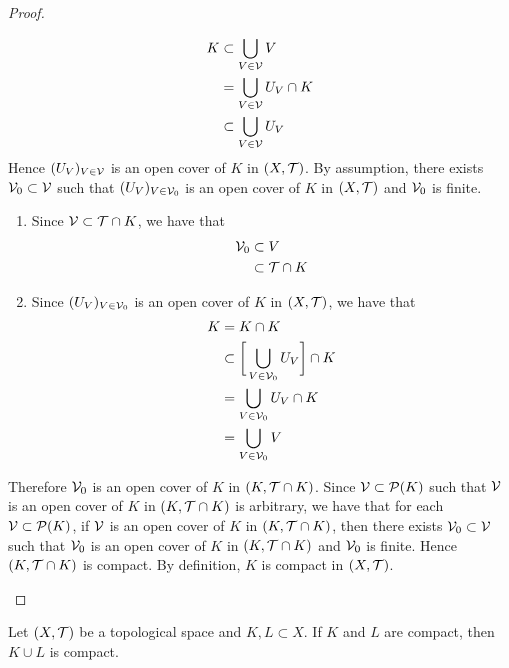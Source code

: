\documentclass{book}
\begin{document}
\begin{proof}
\begin{itemize}
			\begin{align*}
				K 
				& \subset \bigcup_{V \in \mathcal{V}} V \\
				& = \bigcup_{V \in \mathcal{V}} U_V \cap K \\
				& \subset \bigcup_{V \in \mathcal{V}} U_V \\
			\end{align*}
			Hence $(U_V)_{V \in \mathcal{V}}$ is an open cover of $K$ in $(X, \mathcal{T})$. By assumption, there exists $\mathcal{V}_0 \subset \mathcal{V}$ such that $(U_V)_{V \in \mathcal{V}_0}$ is an open cover of $K$ in $(X, \mathcal{T})$ and $\mathcal{V}_0$ is finite. 
			\begin{enumerate}
				\item Since $\mathcal{V} \subset \mathcal{T} \cap K$, we have that 
				\begin{align*}
					\mathcal{V}_0 
					& \subset V \\
					& \subset \mathcal{T} \cap K
				\end{align*}
				\item Since $(U_V)_{V \in \mathcal{V}_0}$ is an open cover of $K$ in $(X, \mathcal{T})$, we have that
				\begin{align*}
					K 
					& = K \cap K \\
					& \subset \bigg[ \bigcup_{V \in \mathcal{V}_0} U_V \bigg] \cap K  \\
					& = \bigcup_{V \in \mathcal{V}_0} U_V \cap K \\
					& = \bigcup_{V \in \mathcal{V}_0} V \\
				\end{align*}
			\end{enumerate}
			Therefore $\mathcal{V}_0$ is an open cover of $K$ in $(K, \mathcal{T} \cap K)$. Since $\mathcal{V} \subset \mathcal{P}(K)$ such that $\mathcal{V}$ is an open cover of $K$ in $(K, \mathcal{T} \cap K)$ is arbitrary, we have that for each $\mathcal{V} \subset \mathcal{P}(K)$, if $\mathcal{V}$ is an open cover of $K$ in $(K, \mathcal{T} \cap K)$, then there exists $\mathcal{V}_0 \subset \mathcal{V}$ such that $\mathcal{V}_0$ is an open cover of $K$ in $(K, \mathcal{T} \cap K)$ and $\mathcal{V}_0$ is finite. Hence $(K, \mathcal{T} \cap K)$ is compact. By definition, $K$ is compact in $(X, \mathcal{T})$.
		\end{itemize}
	\end{proof}

	\begin{ex}
		Let $(X, \mathcal{T})$ be a topological space and $K, L \subset X$. If $K$ and $L$ are compact, then $K \cup L$ is compact. 
	\end{ex}
		
\end{document}
